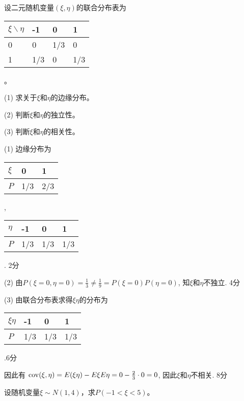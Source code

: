 \documentclass[noanswer]{USTBExam}
\begin{document}


\begin{problem}
设二元随机变量$(\xi, \eta)$的联合分布表为
\begin{tabular}{|l|l|l|l|}
  \hline
  $\xi \backslash \eta$ & -1 & 0 & 1\\
  \hline
  0 & 0 & 1/3 & 0\\
  \hline
  1 & 1/3 & 0 & 1/3\\
  \hline
\end{tabular}。\par
(1) 求关于$\xi$和$\eta$的边缘分布。\par
(2) 判断$\xi$和$\eta$的独立性。\par
(3) 判断$\xi$和$\eta$的相关性。
\end{problem}

\bigskip

\begin{solution}
(1) 边缘分布为 \begin{tabular}{|l|l|l|}
  \hline
  $\xi$ & 0 & 1\\
  \hline
  $P$ & 1/3 & 2/3\\
  \hline
\end{tabular}, \ \begin{tabular}{|l|l|l|l|}
  \hline
  $\eta$ & -1 & 0 & 1\\
  \hline
  $P$ & 1/3 & 1/3 & 1/3\\
  \hline
\end{tabular}. \dotfill 2分 \par
(2) 由$P(\xi = 0, \eta = 0) = \frac{1}{3} \neq \frac{1}{9} = P(\xi = 0) P(\eta = 0)$,
知$\xi$和$\eta$不独立. \dotfill 4分 \par
(3) 由联合分布表求得$\xi \eta$的分布为 \begin{tabular}{|l|l|l|l|}
  \hline
  $\xi \eta$ & -1 & 0 & 1\\
  \hline
  $P$ & 1/3 & 1/3 & 1/3\\
  \hline
\end{tabular}.\dotfill 6分\par
因此有 $\operatorname{\operatorname{cov}}(\xi, \eta) = E(\xi\eta) - E\xi E\eta = 0 -\frac{2}{3} \cdot 0 = 0$,
因此$\xi$和$\eta$不相关. \dotfill 8分
\end{solution}


\begin{problem}
设随机变量$\xi \sim N (1, 4)$，求$P (- 1 < \xi < 5)$。
\end{problem}
\end{document}
